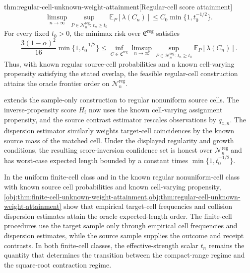 \begin{theoremv}{thm:regular-cell-unknown-weight-attainment}[Regular-cell score attainment]
\[
\limsup_{n\to\infty}\sup_{P\in\mathcal N_n^{\mathrm{reg}}:\,t_n\ge t_0}
\mathbb E_P[\lambda(C_n)]
\le
C_0\min\{1,t_0^{-1/2}\}.
\]
For every fixed \(t_0>0\), the minimax risk over \(\mathfrak C^{\mathrm{reg}}\) satisfies
\[
\frac{3(1-\alpha)^2}{16}\min\{1,t_0^{-1/2}\}
\le
\inf_{C\in\mathfrak C^{\mathrm{reg}}}
\limsup_{n\to\infty}\sup_{P\in\mathcal N_n^{\mathrm{reg}}:\,t_n\ge t_0}
\mathbb E_P[\lambda(C_n)].
\]
Thus, with known regular source-cell probabilities and a known cell-varying propensity satisfying the stated overlap, the feasible regular-cell construction attains the oracle frontier order on \(\mathcal N_n^{\mathrm{reg}}\).
\end{theoremv}

 extends the sample-only construction to regular nonuniform source cells. The inverse-propensity score \(H_i\) now uses the known cell-varying assignment propensity, and the source contrast estimator rescales observations by \(q_{x,n}\). The dispersion estimator similarly weights target-cell coincidences by the known source mass of the matched cell. Under the displayed regularity and growth conditions, the resulting score-inversion confidence set is honest over \(\mathcal N_n^{\mathrm{reg}}\) and has worst-case expected length bounded by a constant times \(\min\{1,t_0^{-1/2}\}\).

In the uniform finite-cell class and in the known regular nonuniform-cell class with known source cell probabilities and known cell-varying propensity, \cref{obj:thm:finite-cell-unknown-weight-attainment,obj:thm:regular-cell-unknown-weight-attainment} show that empirical target-cell frequencies and collision dispersion estimates attain the oracle expected-length order. The finite-cell procedures use the target sample only through empirical cell frequencies and dispersion estimates, while the source sample supplies the outcome and receipt contrasts. In both finite-cell classes, the effective-strength scalar \(t_n\) remains the quantity that determines the transition between the compact-range regime and the square-root contraction regime.
